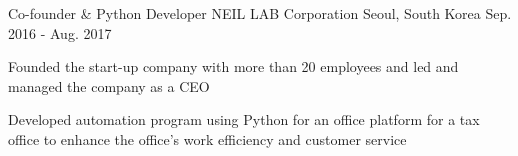


\begin{cventries}


\cventry
{Co-founder \& Python Developer} %
{NEIL LAB Corporation} %
{Seoul, South Korea} %
{Sep. 2016 - Aug. 2017} %
{ %
\begin{cvitems}
\item {Founded the start-up company with more than 20 employees and led and managed the company as a CEO}
\item {Developed automation program using Python for an office platform for a tax office to enhance the office’s work efficiency and customer service}
\end{cvitems}
}

\end{cventries}